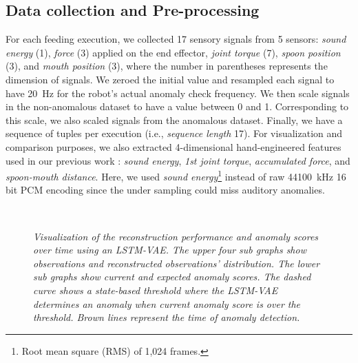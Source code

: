 \documentclass[letterpaper, 10 pt, conference]{ieeeconf}
\begin{document}
\subsection{Data collection and Pre-processing} \label{ss_data_collection}
For each feeding execution, we collected 17 sensory signals from 5 sensors: 
\textit{sound energy} (1), \textit{force} (3) applied on the end effector, \textit{joint torque} (7), \textit{spoon position} (3), and \textit{mouth position} (3), where the number in parentheses represents the dimension of signals. We zeroed the initial value and resampled each signal to have \SI{20}{Hz} for the robot's actual anomaly check frequency. We then scale signals in the non-anomalous dataset to have a value between 0 and 1. Corresponding to this scale, we also scaled signals from the anomalous dataset. Finally, we have a sequence of tuples per execution (i.e., \textit{sequence length}  17). For visualization and comparison purposes, we also extracted 4-dimensional hand-engineered features used in our previous work \cite{park2017detection}: \textit{sound energy}, \textit{1st joint torque}, \textit{accumulated force}, and \textit{spoon-mouth distance}. Here, we used \textit{sound energy}\footnote{Root mean square (RMS) of 1,024 frames.} instead of raw \SI{44100}{\kHz} 16 bit PCM encoding since the under sampling could miss auditory anomalies. 


\begin{figure}
	\centering
    \\
	\caption{\textit{Visualization of the reconstruction performance and anomaly scores over time using an LSTM-VAE. The upper four sub graphs show observations and reconstructed observations' distribution. The lower sub graphs show current and expected anomaly scores. The dashed curve shows a state-based threshold where the LSTM-VAE determines an anomaly when current anomaly score is over the threshold. Brown lines represent the time of anomaly detection.}}
    \vspace{-1.5em}
	\label{fig: reconstruction}
\end{figure}
\end{document}
